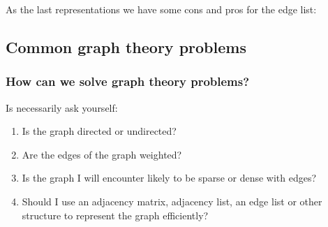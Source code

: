As the last representations we have some cons and pros for the edge list:

\begin{table}[]
    \centering
\end{table}

\subsection{Common graph theory problems}

\subsubsection{How can we solve graph theory problems?}
Is necessarily ask yourself:
\begin{enumerate}
    \item {Is the graph directed or undirected?}
    \item {Are the edges of the graph weighted?}
    \item {Is the graph I will encounter likely to be sparse or dense with edges?}
    \item {Should I use an adjacency matrix, adjacency list, an edge list or other structure to represent the graph efficiently?}
\end{enumerate}

